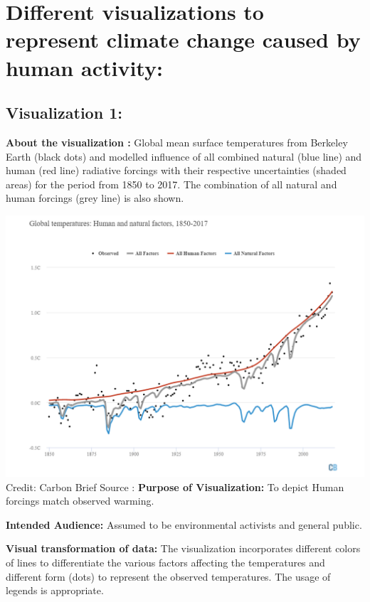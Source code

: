 \documentclass[]{book}
\begin{document}
\hypertarget{different-visualizations-to-represent-climate-change-caused-by-human-activity}{%
\section{Different visualizations to represent climate change caused by human activity:}\label{different-visualizations-to-represent-climate-change-caused-by-human-activity}}

\hypertarget{visualization-1}{%
\subsection{Visualization 1:}\label{visualization-1}}

\textbf{About the visualization :}
Global mean surface temperatures from Berkeley Earth (black dots) and modelled influence of all combined natural (blue line) and human (red line) radiative forcings with their respective uncertainties (shaded areas) for the period from 1850 to 2017. The combination of all natural and human forcings (grey line) is also shown.

\includegraphics{images/Vz1-HumanNatural.png}
Credit: Carbon Brief
Source :\citep{Global}
\textbf{Purpose of Visualization:} To depict Human forcings match observed warming.

\textbf{Intended Audience:} Assumed to be environmental activists and general public.

\textbf{Visual transformation of data:} The visualization incorporates different colors of lines to differentiate the various factors affecting the temperatures and different form (dots) to represent the observed temperatures. The usage of legends is appropriate.
\end{document}
